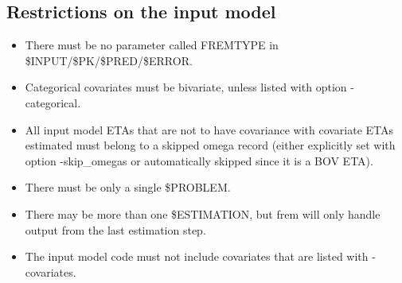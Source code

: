 \subsection{Restrictions on the input model}
\begin{itemize}
	\item There must be no parameter called FREMTYPE in \$INPUT/\$PK/\$PRED/\$ERROR.
	\item Categorical covariates must be bivariate, unless listed with option -categorical.
    \item All input model ETAs that are not to have covariance with covariate ETAs estimated must
    belong to a skipped omega record (either explicitly set with option -skip\_omegas or
    automatically skipped since it is a BOV ETA).
    \item There must be only a single \$PROBLEM.
    \item There may be more than one \$ESTIMATION, but frem will only handle output from the last estimation step.
    \item The input model code must not include covariates that are listed with
    -covariates.

\end{itemize}
